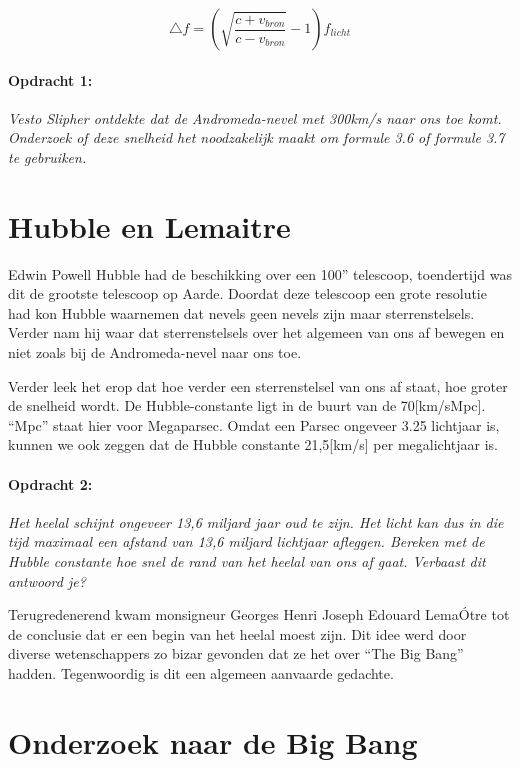 \begin{equation}
\triangle f=\left(\sqrt{\frac{c+v_{bron}}{c-v_{bron}}}-1\right)f_{licht}
\end{equation}



\paragraph*{Opdracht 1:}

\emph{Vesto Slipher ontdekte dat de Andromeda-nevel met 300km/s naar
ons toe komt. Onderzoek of deze snelheid het noodzakelijk maakt om
formule 3.6 of formule 3.7 te gebruiken.}


\section{Hubble en Lemaitre}

Edwin Powell Hubble had de beschikking over een 100'' telescoop,
toendertijd was dit de grootste telescoop op Aarde. Doordat deze telescoop
een grote resolutie had kon Hubble waarnemen dat nevels geen nevels
zijn maar sterrenstelsels. Verder nam hij waar dat sterrenstelsels
over het algemeen van ons af bewegen en niet zoals bij de Andromeda-nevel
naar ons toe. 

Verder leek het erop dat hoe verder een sterrenstelsel van ons af
staat, hoe groter de snelheid wordt. De Hubble-constante ligt in de
buurt van de 70{[}km/sMpc{]}. ``Mpc'' staat hier voor Megaparsec.
Omdat een Parsec ongeveer 3.25 lichtjaar is, kunnen we ook zeggen
dat de Hubble constante 21,5{[}km/s{]} per megalichtjaar is.


\paragraph*{Opdracht 2:}

\emph{Het heelal schijnt ongeveer 13,6 miljard jaar oud te zijn. Het
licht kan dus in die tijd maximaal een afstand van 13,6 miljard lichtjaar
afleggen. Bereken met de Hubble constante hoe snel de rand van het
heelal van ons af gaat. Verbaast dit antwoord je?}

Terugredenerend kwam monsigneur Georges Henri Joseph Edouard LemaÓtre
tot de conclusie dat er een begin van het heelal moest zijn. Dit idee
werd door diverse wetenschappers zo bizar gevonden dat ze het over
``The Big Bang'' hadden. Tegenwoordig is dit een algemeen aanvaarde
gedachte.


\section{Onderzoek naar de Big Bang}

